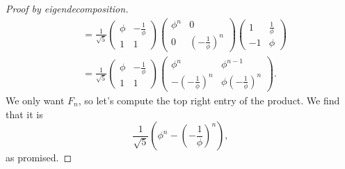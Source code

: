 \documentclass[12pt]{article}
\begin{document}
\begin{proof}[Proof by eigendecomposition]
\[\begin{split}
        &= \frac 1{\sqrt5}\begin{pmatrix}\phi&-\frac 1{\phi}\\1&1\end{pmatrix}\begin{pmatrix}\phi^n&0\\0&\left(-\frac 1{\phi}\right)^n\end{pmatrix}\begin{pmatrix}1&\frac 1{\phi}\\-1&\phi\end{pmatrix}\\
        &= \frac 1{\sqrt5}\begin{pmatrix}\phi & -\frac 1{\phi}\\1&1\end{pmatrix}\begin{pmatrix} \phi^n & \phi^{n-1}\\-\left(-\frac1{\phi}\right)^n & \phi\left(-\frac 1{\phi}\right)^n\end{pmatrix}.
        \end{split}\]
    We only want $F_n$, so let's compute the top right entry of the product. We find that it is
    \[\frac 1{\sqrt5}\left(\phi^n-\left(-\frac 1{\phi}\right)^n\right),\]
    as promised.
\end{proof}
\end{document}
